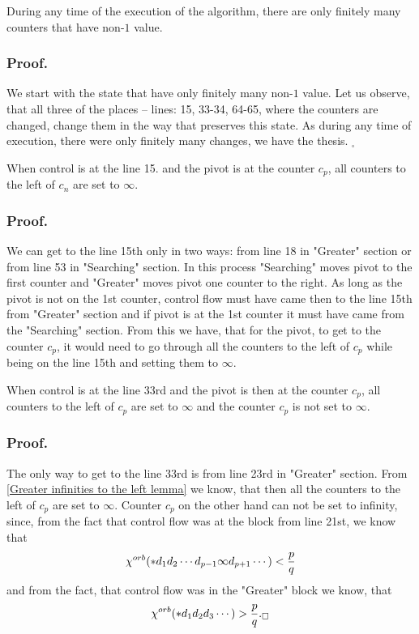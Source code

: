 \begin{lemma}
During any time of the execution of the algorithm, there are only finitely many counters 
that have non-$1$ value.
\end{lemma}
\subsubsection{Proof.}
We start with the state that have only finitely many non-$1$ value. Let us observe, that 
all three of the places -- lines: 15, 33-34, 64-65, 
where the counters are changed, change them in the way 
that preserves this state. As during any time of execution, there were only finitely many 
changes, we have the thesis. $_\square$

\begin{lemma}\label{Greater infinities to the left lemma}
When control is at the line 15. and the pivot is at the counter $c_p$, all counters 
to the left of $c_n$ are set to $\infty$. 
\end{lemma}
\subsubsection{Proof.}
We can get to the line 15th only in two ways: from line 18 in "Greater" section or from line 53 
in "Searching" section. 
In this process "Searching" moves pivot to the first counter and  
"Greater" moves pivot one counter to the right. 
As long as the pivot is not on the 1st counter, control flow must have came then to the line 15th 
from "Greater" section and if pivot is at the 1st counter it must have came from the 
"Searching" section. From this we have,  
that for the pivot, to get to the counter $c_p$, it would need to go through all 
the counters to the left of $c_p$ while being on the line 15th and 
setting them to $\infty$. 
\begin{lemma}\label{Searching infinities to the left lemma}
When control is at the line 33rd and the pivot is then at the counter $c_p$, all counters 
to the left of $c_p$ are set to $\infty$ and the counter $c_p$ is not set to $\infty$. 
\end{lemma}
\subsubsection{Proof.}
The only way to get to the line 33rd is from line 23rd in "Greater" section. 
From \ref{Greater infinities to the left lemma} we know, that then all the counters to the left 
of $c_p$ are set to $\infty$. Counter $c_p$ on the other hand can not be set to infinity, 
since, from the fact that control flow was at the block from line 21st, we know that
\begin{equation}
{\chi^{orb}(*d_1d_2\cdots d_{p-1}\infty d_{p+1}\cdots)} < \frac{p}{q}
\end{equation}
and from the fact, that control flow was in the "Greater" block we know, that 
\begin{equation}
{\chi^{orb}(*d_1d_2d_3\cdots )} > \frac{p}{q}._\square
\end{equation}


